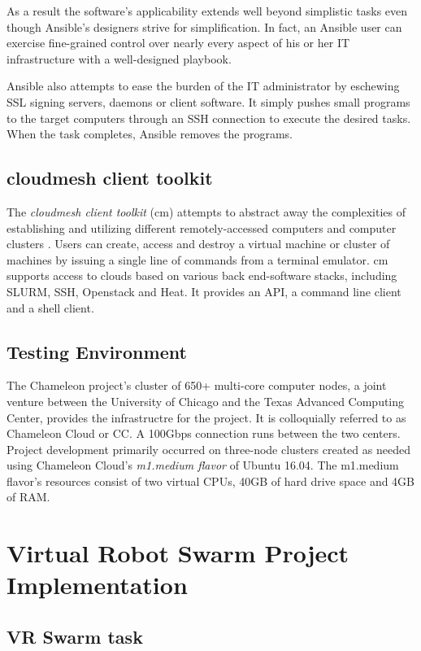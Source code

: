 \documentclass[9pt,twocolumn,twoside]{../../styles/osajnl}
\begin{document}
As a result the software's applicability extends well beyond simplistic tasks even though Ansible's designers strive for simplification.  In fact, an Ansible user can exercise fine-grained control over nearly every aspect of his or her IT infrastructure with a well-designed playbook.  

Ansible also attempts to ease the burden of the IT administrator by eschewing SSL signing servers, daemons or client software.  It simply pushes small programs to the target computers through an SSH connection to execute the desired tasks.  When the task completes, Ansible removes the programs. 

\subsection{cloudmesh client toolkit}
The \textit{cloudmesh client toolkit} (cm) attempts to abstract away the complexities of establishing and utilizing different remotely-accessed computers and computer clusters \cite{www-cm}.  Users can create, access and destroy a virtual machine or cluster of machines by issuing a single line of commands from a terminal emulator.  cm supports access to clouds based on various back end-software stacks, including SLURM, SSH, Openstack and Heat.  It provides an API, a command line client and a shell client.

\subsection{Testing Environment}
The Chameleon project's cluster of 650+ multi-core computer nodes, a joint venture between the University of Chicago and the Texas Advanced Computing Center, provides the infrastructre for the project.  It is colloquially referred to as Chameleon Cloud or CC.  A 100Gbps connection runs between the two centers. Project development primarily occurred on three-node clusters created as needed using Chameleon Cloud's \textit{m1.medium flavor} of Ubuntu 16.04.  The m1.medium flavor's resources consist of two virtual CPUs, 40GB of hard drive space and 4GB of RAM.  

\section{Virtual Robot Swarm Project Implementation}
\subsection{VR Swarm task}
\end{document}
